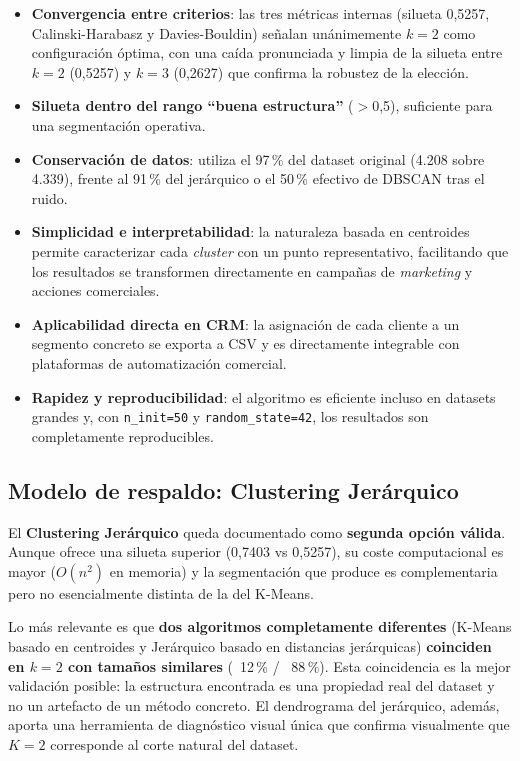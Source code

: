\documentclass[11pt,a4paper]{article}
\begin{document}
\begin{itemize}
    \item \textbf{Convergencia entre criterios}: las tres métricas internas (silueta 0,5257, Calinski-Harabasz y Davies-Bouldin) señalan unánimemente $k=2$ como configuración óptima, con una caída pronunciada y limpia de la silueta entre $k=2$ (0,5257) y $k=3$ (0,2627) que confirma la robustez de la elección.
    \item \textbf{Silueta dentro del rango ``buena estructura''} ($>$0,5), suficiente para una segmentación operativa.
    \item \textbf{Conservación de datos}: utiliza el 97\,\% del dataset original (4.208 sobre 4.339), frente al 91\,\% del jerárquico o el 50\,\% efectivo de DBSCAN tras el ruido.
    \item \textbf{Simplicidad e interpretabilidad}: la naturaleza basada en centroides permite caracterizar cada \textit{cluster} con un punto representativo, facilitando que los resultados se transformen directamente en campañas de \textit{marketing} y acciones comerciales.
    \item \textbf{Aplicabilidad directa en CRM}: la asignación de cada cliente a un segmento concreto se exporta a CSV y es directamente integrable con plataformas de automatización comercial.
    \item \textbf{Rapidez y reproducibilidad}: el algoritmo es eficiente incluso en datasets grandes y, con \texttt{n\_init=50} y \texttt{random\_state=42}, los resultados son completamente reproducibles.
\end{itemize}

\subsection{Modelo de respaldo: Clustering Jerárquico}

El \textbf{Clustering Jerárquico} queda documentado como \textbf{segunda opción válida}. Aunque ofrece una silueta superior (0,7403 vs 0,5257), su coste computacional es mayor ($O(n^2)$ en memoria) y la segmentación que produce es complementaria pero no esencialmente distinta de la del K-Means.

Lo más relevante es que \textbf{dos algoritmos completamente diferentes} (K-Means basado en centroides y Jerárquico basado en distancias jerárquicas) \textbf{coinciden en $k=2$ con tamaños similares} (~12\,\% / ~88\,\%). Esta coincidencia es la mejor validación posible: la estructura encontrada es una propiedad real del dataset y no un artefacto de un método concreto. El dendrograma del jerárquico, además, aporta una herramienta de diagnóstico visual única que confirma visualmente que $K=2$ corresponde al corte natural del dataset.
\end{document}
